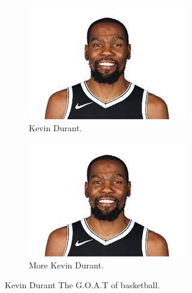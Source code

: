 \documentclass{article}
\begin{document}
	\begin{figure}[h!]
		\centering
		\begin{subfigure}[b]{0.4\linewidth}
			\includegraphics[width=\linewidth]{kevin durant.jpg}
			\caption{Kevin Durant.}
		\end{subfigure}
		\begin{subfigure}[b]{0.4\linewidth}
			\includegraphics[width=\linewidth]{kevin durant.jpg}
			\caption{More Kevin Durant.}
		\end{subfigure}
	\caption{Kevin Durant The G.O.A.T of basketball.}
	\label{fig:KD}
	\end{figure}
\end{document}
